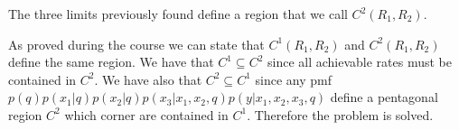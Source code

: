 The three limits previously found define a region that we call $C^2(R_1,R_2)$.

As proved during the course we can state that $C^1(R_1,R_2)$ and $C^2(R_1,R_2)$ define the same region. We have that $C^1 \subseteq C^2$ since all achievable rates must be contained in $C^2$. We have also that $C^2 \subseteq C^1$ since any pmf $p(q)p(x_1|q)p(x_2|q)p(x_3|x_1,x_2,q)p(y|x_1,x_2,x_3,q)$ define a pentagonal region $C^2$ which corner are contained in $C^1$. Therefore the problem is solved.
